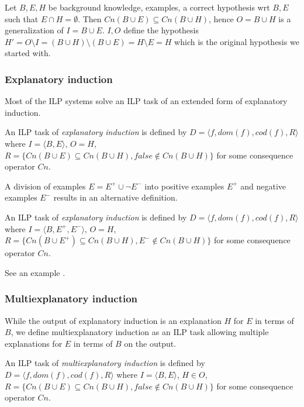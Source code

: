 \begin{exmp}
Let $B, E, H$ be background knowledge, examples, a correct hypothesis wrt $B, E$ such that $E \cap H=\emptyset$.
Then $Cn(B \cup E) \subseteq Cn(B \cup H)$, hence $O=B \cup H$ is a generalization of $I=B \cup E$.
$I, O$ define the hypothesis $H'=O \setminus I=(B \cup H) \setminus (B \cup E)=H \setminus E=H$ which is the original hypothesis we started with.
\end{exmp}

\subsubsection{Explanatory induction}
Most of the ILP systems solve an ILP task of an extended form of explanatory induction.\cite{kimber2012learning}\cite{aleph2007}\cite{nienhuys1997foundations}

\begin{defn}\label{defn_explanatory_induction}
An ILP task of \emph{explanatory induction} is defined by $D=\langle f, dom(f), cod(f), R \rangle$ where $I=\langle B, E \rangle$, $O=H$,
$R=\{Cn(B \cup E) \subseteq Cn(B \cup H), false \not\in Cn(B \cup H)\}$ for some consequence operator $Cn$.
\end{defn}
A division of examples $E=E^{+} \cup \neg E^{-}$ into positive examples $E^{+}$ and negative examples $E^{-}$ results in an alternative definition.

\begin{defn}
An ILP task of \emph{explanatory induction} is defined by $D=\langle f, dom(f), cod(f), R \rangle$ where $I=\langle B, E^{+}, E^{-} \rangle$, $O=H$,
$R=\{Cn(B \cup E^{+}) \subseteq Cn(B \cup H), E^{-} \not\in Cn(B \cup H)\}$ for some consequence operator $Cn$.
\end{defn}

See an example .

\subsubsection{Multiexplanatory induction}
While the output of explanatory induction is an explanation $H$ for $E$ in terms of $B$, we define multiexplanatory induction as an ILP task allowing multiple explanations for $E$ in terms of $B$ on the output.

\begin{defn}\label{defn_multiexplanatory_induction}
An ILP task of \emph{multiexplanatory induction} is defined by $D=\langle f, dom(f), cod(f), R \rangle$ where $I=\langle B, E \rangle$, $H \in O$,
$R=\{Cn(B \cup E) \subseteq Cn(B \cup H), false \not\in Cn(B \cup H)\}$ for some consequence operator $Cn$.
\end{defn}

